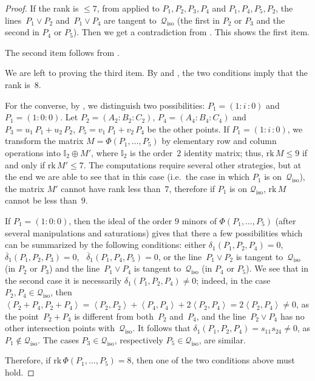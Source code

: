 \documentclass[a4paper, 11pt, reqno]{amsart}
\theoremstyle{plain}
\theoremstyle{definition}
\newcommand{\iii}{\textit{i}\,}
\newcommand{\rk}{\ensuremath{\mathrm{rk}}}
\newcommand{\iso}{\mathcal{Q}_{\mathrm{iso}}}
\newcommand{\scl}[2]{\left\langle {#1}, {#2} \right\rangle}
\begin{document}
\begin{proof}
If the rank is $\leq 7$, from
 applied to $P_1, P_2, P_3, P_4$ and $P_1, P_4, P_5, P_2$,
the lines~$P_1 \vee P_2$ and~$P_1 \vee P_4$ are tangent to~$\iso$ (the first in $P_2$ or $P_3$ and the second in $P_4$ or $P_5$).
Then we get a contradiction from .
This shows the first item.

The second item follows from .

We are left to proving the third item. By  and , the two conditions imply that the rank is~$8$.

For the converse, by , we distinguish two possibilities:
$P_1 = (1:\iii :0)$ and
$P_1 = (1: 0: 0)$.
Let $P_2 = (A_2: B_2: C_2)$, $P_4 = (A_4: B_4: C_4)$ and
$P_3 = u_1 \, P_1 + u_2 \, P_2$, $P_5 = v_1 \, P_1 + v_2 \, P_4$ be the other points.
If $P_1 = (1: \iii: 0)$, we transform the matrix $M = \Phi(P_1, \dots, P_5)$ by elementary row and column operations into $\mathbb{I}_2 \oplus M'$, where $\mathbb{I}_2$ is the order~$2$ identity matrix; thus, $\rk \, M \leq 9$ if and only if $\rk \, M' \leq 7$.
The computations require several other strategies, but at the end we are
able to see that in this case (i.e.\ the case in which $P_1$ is on~$\iso$), the matrix $M'$ cannot have rank less than~$7$, therefore if $P_1$ is on 
$\iso$, $\rk\, M$ cannot be less than~$9$.

If $P_1 = (1: 0: 0)$, then the ideal of the order $9$ minors of
$\Phi(P_1, \dots, P_5)$ (after several manipulations and saturations)
gives that there a few possibilities which can be summarized by the
following conditions: either $\delta_1(P_1, P_2, P_4) = 0$,
\ $\overline{\delta}_1(P_1, P_2, P_3) = 0$,
\ $\overline{\delta}_1(P_1, P_4, P_5) = 0$, or the line~$P_1 \vee P_2$ is tangent to~$\iso$ (in $P_2$ or $P_3$) and the line~$P_1 \vee P_4$ is tangent to~$\iso$ (in $P_4$ or $P_5$). We see that in the second case it is necessarily $\delta_1(P_1,P_2,P_4)
\neq 0$; indeed, in the case $P_2, P_4 \in \iso$, then $\scl{P_2 +P_4}{P_2+P_4}= \scl{P_2}{P_2} + \scl{P_4}{P_4}+2\scl{P_2}{P_4} =2\scl{P_2}{P_4} \neq 0$, as
the point~$P_2 + P_4$ is different from both~$P_2$ and~$P_4$, and the line~$P_2 \vee P_4$ has no other intersection points with~$\iso$. It follows that
$\delta_1 (P_1,P_2,P_4)=s_{11}s_{24} \neq 0$, as $P_1 \not\in \iso$. The cases $P_3 \in \iso$, respectively $P_5\in \iso$, are similar.

Therefore, if $\rk \, \Phi(P_1, \dots, P_5) = 8$, then one of the two conditions above must hold.
\end{proof}
\end{document}
